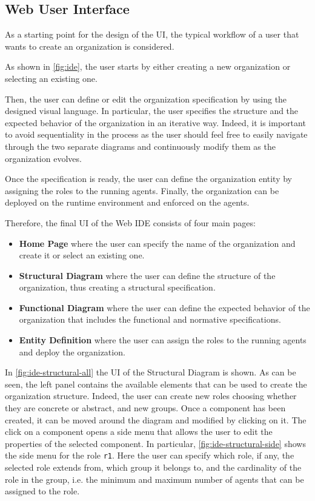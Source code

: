 \subsection{Web User Interface}
As a starting point for the design of the UI, the typical workflow of a user that wants to create an organization is considered.

As shown in \cref{fig:ide}, the user starts by either creating a new organization or selecting an existing one.

Then, the user can define or edit the organization specification by using the designed visual language.
In particular, the user specifies the structure and the expected behavior of the organization in an iterative way.
Indeed, it is important to avoid sequentiality in the process as the user should feel free to easily navigate through the two separate diagrams and continuously modify them as the organization evolves.

Once the specification is ready, the user can define the organization entity by assigning the roles to the running agents. Finally, the organization can be deployed on the runtime environment and enforced on the agents.

Therefore, the final UI of the Web IDE consists of four main pages:
\begin{itemize}
    \item \textbf{Home Page} where the user can specify the name of the organization and create it or select an existing one.
    \item \textbf{Structural Diagram} where the user can define the structure of the organization, thus creating a structural specification.
    \item \textbf{Functional Diagram} where the user can define the expected behavior of the organization that includes the functional and normative specifications.
    \item \textbf{Entity Definition} where the user can assign the roles to the running agents and deploy the organization.
\end{itemize}

In \cref{fig:ide-structural-all} the UI of the Structural Diagram is shown.
As can be seen, the left panel contains the available elements that can be used to create the organization structure.
Indeed, the user can create new roles choosing whether they are concrete or abstract, and new groups.
Once a component has been created, it can be moved around the diagram and modified by clicking on it.
The click on a component opens a side menu that allows the user to edit the properties of the selected component.
In particular, \cref{fig:ide-structural-side} shows the side menu for the role \texttt{r1}.
Here the user can specify which role, if any, the selected role extends from, which group it belongs to, and the cardinality of the role in the group, i.e. the minimum and maximum number of agents that can be assigned to the role.

